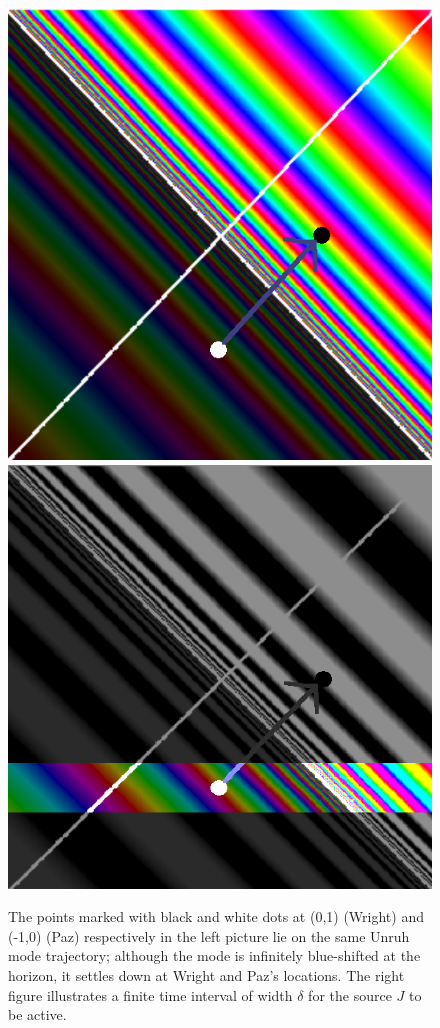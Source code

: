 \documentclass[12pt,a4paper]{article}
\begin{document}
\begin{figure}[h]
\centering
\includegraphics[scale=0.75]{paz_freq.png}
\hspace{20 pt}
\includegraphics[scale=0.235]{paz_bw.png}
\captionsetup{width=0.7\textwidth}
\caption{The points marked with black and white dots at (0,1) (Wright) and (-1,0) (Paz) respectively in the left picture lie on the same Unruh mode trajectory; although the mode is infinitely blue-shifted at the horizon, it settles down at Wright and Paz's locations. The right figure illustrates a finite time interval of width $\delta$ for the source $J$ to be active.}
\label{paz_freq}
\end{figure}
\end{document}

